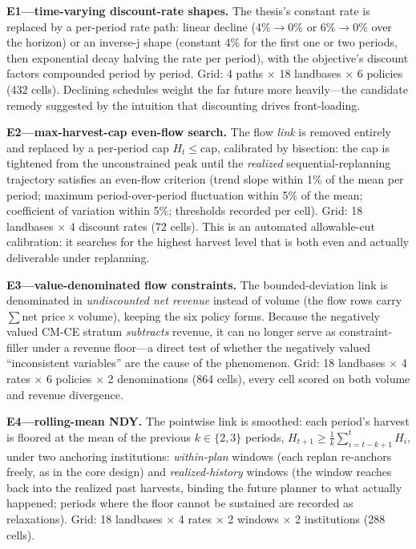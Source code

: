 \textbf{E1---time-varying discount-rate shapes.} The thesis's constant rate is replaced by a per-period rate path: linear decline (4\%$\to$0\% or 6\%$\to$0\% over the horizon) or an inverse-j shape (constant 4\% for the first one or two periods, then exponential decay halving the rate per period), with the objective's discount factors compounded period by period. Grid: 4 paths $\times$ 18 landbases $\times$ 6 policies (432 cells). Declining schedules weight the far future more heavily---the candidate remedy suggested by the intuition that discounting drives front-loading.

\textbf{E2---max-harvest-cap even-flow search.} The flow \emph{link} is removed entirely and replaced by a per-period cap $H_t \leq \mathrm{cap}$, calibrated by bisection: the cap is tightened from the unconstrained peak until the \emph{realized} sequential-replanning trajectory satisfies an even-flow criterion (trend slope within 1\% of the mean per period; maximum period-over-period fluctuation within 5\% of the mean; coefficient of variation within 5\%; thresholds recorded per cell). Grid: 18 landbases $\times$ 4 discount rates (72 cells). This is an automated allowable-cut calibration: it searches for the highest harvest level that is both even and actually deliverable under replanning.

\textbf{E3---value-denominated flow constraints.} The bounded-deviation link is denominated in \emph{undiscounted net revenue} instead of volume (the flow rows carry $\sum \text{net price} \times \text{volume}$), keeping the six policy forms. Because the negatively valued CM-CE stratum \emph{subtracts} revenue, it can no longer serve as constraint-filler under a revenue floor---a direct test of whether the negatively valued ``inconsistent variables'' are the cause of the phenomenon. Grid: 18 landbases $\times$ 4 rates $\times$ 6 policies $\times$ 2 denominations (864 cells), every cell scored on both volume and revenue divergence.

\textbf{E4---rolling-mean NDY.} The pointwise link is smoothed: each period's harvest is floored at the mean of the previous $k \in \{2, 3\}$ periods, $H_{t+1} \geq \frac{1}{k}\sum_{i=t-k+1}^{t} H_i$, under two anchoring institutions: \emph{within-plan} windows (each replan re-anchors freely, as in the core design) and \emph{realized-history} windows (the window reaches back into the realized past harvests, binding the future planner to what actually happened; periods where the floor cannot be sustained are recorded as relaxations). Grid: 18 landbases $\times$ 4 rates $\times$ 2 windows $\times$ 2 institutions (288 cells).

